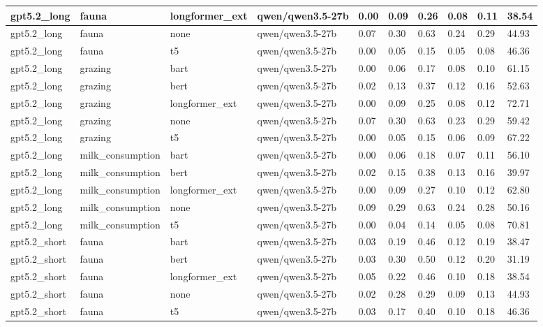 \begin{tabular}{|l|l|l|l|l|l|l|l|l|l|}
 \hline
 gpt5.2\_long & fauna & longformer\_ext & qwen/qwen3.5-27b & 0.00 & 0.09 & 0.26 & 0.08 & 0.11 & 38.54 \\
 \hline
 gpt5.2\_long & fauna & none & qwen/qwen3.5-27b & 0.07 & 0.30 & 0.63 & 0.24 & 0.29 & 44.93 \\
 \hline
 gpt5.2\_long & fauna & t5 & qwen/qwen3.5-27b & 0.00 & 0.05 & 0.15 & 0.05 & 0.08 & 46.36 \\
 \hline
 gpt5.2\_long & grazing & bart & qwen/qwen3.5-27b & 0.00 & 0.06 & 0.17 & 0.08 & 0.10 & 61.15 \\
 \hline
 gpt5.2\_long & grazing & bert & qwen/qwen3.5-27b & 0.02 & 0.13 & 0.37 & 0.12 & 0.16 & 52.63 \\
 \hline
 gpt5.2\_long & grazing & longformer\_ext & qwen/qwen3.5-27b & 0.00 & 0.09 & 0.25 & 0.08 & 0.12 & 72.71 \\
 \hline
 gpt5.2\_long & grazing & none & qwen/qwen3.5-27b & 0.07 & 0.30 & 0.63 & 0.23 & 0.29 & 59.42 \\
 \hline
 gpt5.2\_long & grazing & t5 & qwen/qwen3.5-27b & 0.00 & 0.05 & 0.15 & 0.06 & 0.09 & 67.22 \\
 \hline
 gpt5.2\_long & milk\_consumption & bart & qwen/qwen3.5-27b & 0.00 & 0.06 & 0.18 & 0.07 & 0.11 & 56.10 \\
 \hline
 gpt5.2\_long & milk\_consumption & bert & qwen/qwen3.5-27b & 0.02 & 0.15 & 0.38 & 0.13 & 0.16 & 39.97 \\
 \hline
 gpt5.2\_long & milk\_consumption & longformer\_ext & qwen/qwen3.5-27b & 0.00 & 0.09 & 0.27 & 0.10 & 0.12 & 62.80 \\
 \hline
 gpt5.2\_long & milk\_consumption & none & qwen/qwen3.5-27b & 0.09 & 0.29 & 0.63 & 0.24 & 0.28 & 50.16 \\
 \hline
 gpt5.2\_long & milk\_consumption & t5 & qwen/qwen3.5-27b & 0.00 & 0.04 & 0.14 & 0.05 & 0.08 & 70.81 \\
 \hline
 gpt5.2\_short & fauna & bart & qwen/qwen3.5-27b & 0.03 & 0.19 & 0.46 & 0.12 & 0.19 & 38.47 \\
 \hline
 gpt5.2\_short & fauna & bert & qwen/qwen3.5-27b & 0.03 & 0.30 & 0.50 & 0.12 & 0.20 & 31.19 \\
 \hline
 gpt5.2\_short & fauna & longformer\_ext & qwen/qwen3.5-27b & 0.05 & 0.22 & 0.46 & 0.10 & 0.18 & 38.54 \\
 \hline
 gpt5.2\_short & fauna & none & qwen/qwen3.5-27b & 0.02 & 0.28 & 0.29 & 0.09 & 0.13 & 44.93 \\
 \hline
 gpt5.2\_short & fauna & t5 & qwen/qwen3.5-27b & 0.03 & 0.17 & 0.40 & 0.10 & 0.18 & 46.36 \\

\end{tabular}
